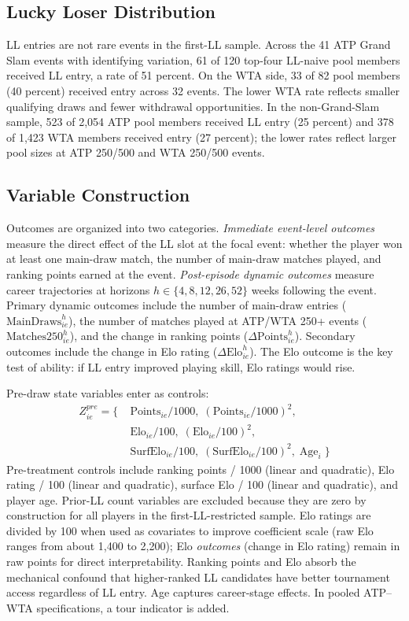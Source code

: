 \subsection{Lucky Loser Distribution}
\label{sec:data_distribution}

LL entries are not rare events in the first-LL sample. Across the 41 ATP Grand Slam events with identifying variation, 61 of 120 top-four LL-naive pool members received LL entry, a rate of 51 percent. On the WTA side, 33 of 82 pool members (40 percent) received entry across 32 events. The lower WTA rate reflects smaller qualifying draws and fewer withdrawal opportunities. In the non-Grand-Slam sample, 523 of 2,054 ATP pool members received LL entry (25 percent) and 378 of 1,423 WTA members received entry (27 percent); the lower rates reflect larger pool sizes at ATP 250/500 and WTA 250/500 events.

\subsection{Variable Construction}
\label{sec:data_variables}

Outcomes are organized into two categories. \textit{Immediate event-level outcomes} measure the direct effect of the LL slot at the focal event: whether the player won at least one main-draw match, the number of main-draw matches played, and ranking points earned at the event. \textit{Post-episode dynamic outcomes} measure career trajectories at horizons $h \in \{4, 8, 12, 26, 52\}$ weeks following the event. Primary dynamic outcomes include the number of main-draw entries ($\text{MainDraws}_{ie}^{h}$), the number of matches played at ATP/WTA 250+ events ($\text{Matches250}_{ie}^{h}$), and the change in ranking points ($\Delta \text{Points}_{ie}^{h}$). Secondary outcomes include the change in Elo rating ($\Delta \text{Elo}_{ie}^{h}$). The Elo outcome is the key test of ability: if LL entry improved playing skill, Elo ratings would rise.

Pre-draw state variables enter as controls:
\begin{align*}
Z^{pre}_{ie} = \{\; & \text{Points}_{ie}/1000,\; (\text{Points}_{ie}/1000)^2, \\
 & \text{Elo}_{ie}/100,\; (\text{Elo}_{ie}/100)^2, \\
 & \text{SurfElo}_{ie}/100,\; (\text{SurfElo}_{ie}/100)^2,\; \text{Age}_i \;\}
\end{align*}
Pre-treatment controls include ranking points / 1000 (linear and quadratic), Elo rating / 100 (linear and quadratic), surface Elo / 100 (linear and quadratic), and player age. Prior-LL count variables are excluded because they are zero by construction for all players in the first-LL-restricted sample. Elo ratings are divided by 100 when used as covariates to improve coefficient scale (raw Elo ranges from about 1,400 to 2,200); Elo \textit{outcomes} (change in Elo rating) remain in raw points for direct interpretability. Ranking points and Elo absorb the mechanical confound that higher-ranked LL candidates have better tournament access regardless of LL entry. Age captures career-stage effects. In pooled ATP--WTA specifications, a tour indicator is added.

